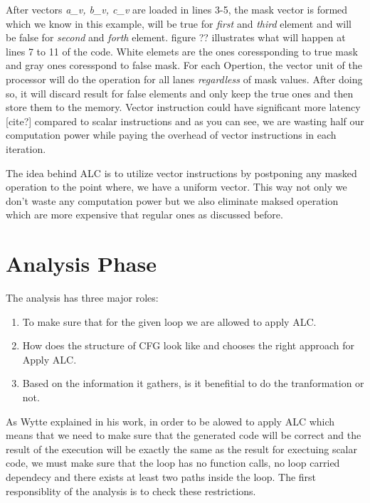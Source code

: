 \documentclass[\main/thesis.tex]{subfiles}
\begin{document}
After vectors \emph{a\_v, b\_v, c\_v} are loaded in lines 3-5, the mask vector is formed which we know in this example, will be true for \emph{first} and \emph{third} element and will be false for \emph{second} and \emph{forth} element. figure ?? illustrates what will happen at lines 7 to 11 of the code. White elemets are the ones coressponding to true mask and gray ones coresspond to false mask.
For each Opertion, the vector unit of the processor will do the operation for all lanes \emph{regardless} of mask values. After doing so, it will discard result for false elements and only keep the true ones and then store them to the memory. Vector instruction could have significant more latency [cite?] compared to scalar instructions and as you can see, we are wasting half our computation power while paying the overhead of vector instructions in each iteration.

The idea behind ALC is to utilize vector instructions by postponing any masked operation to the point where, we have a uniform vector. This way not only we don't waste any computation power but we also eliminate maksed operation which are more expensive that regular ones as discussed before.




















\section{Analysis Phase}

The analysis has three major roles:
\begin{enumerate}
    \item To make sure that for the given loop we are allowed to apply ALC.
    \item How does the structure of CFG look like and chooses the right approach for Apply ALC.
    \item Based on the information it gathers, is it benefitial to do the tranformation or not.
\end{enumerate}

As Wytte explained in his work, in order to be alowed to apply ALC which means that we need to make sure that the generated code will be correct and the result of the execution will be exactly the same as the result for exectuing scalar code, we must make sure that the loop has no function calls, no loop carried dependecy and there exists at least two paths inside the loop. The first responsiblity of the analysis is to check these restrictions.
\end{document}
